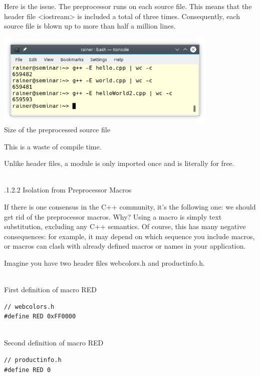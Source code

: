 Here is the issue. The preprocessor runs on each source file. This means that the header file <iostream> is included a total of three times. Consequently, each source file is blown up to more than half a million lines.

\begin{center}
\includegraphics[width=0.8\textwidth]{content/3/chapter4/images/15.png}\\
Size of the preprocessed source file
\end{center}

This is a waste of compile time.

Unlike header files, a module is only imported once and is literally for free.

\hspace*{\fill} \\ %
.1.2.2\hspace{0.2cm} Isolation from Preprocessor Macros

If there is one consensus in the C++ community, it’s the following one: we should get rid of the preprocessor macros. Why? Using a macro is simply text substitution, excluding any C++ semantics. Of course, this has many negative consequences: for example, it may depend on which sequence you include macros, or macros can clash with already defined macros or names in your application.

Imagine you have two header files webcolors.h and productinfo.h.

\hspace*{\fill} \\ %
\noindent
First definition of macro RED
\begin{lstlisting}[style=styleCXX]
// webcolors.h
#define RED 0xFF0000
\end{lstlisting}

\hspace*{\fill} \\ %
\noindent
Second definition of macro RED
\begin{lstlisting}[style=styleCXX]
// productinfo.h
#define RED 0
\end{lstlisting}

